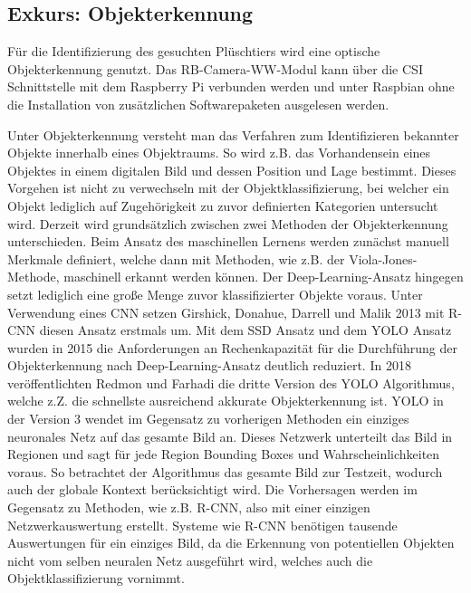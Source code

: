 \subsection{Exkurs: Objekterkennung}

Für die Identifizierung des gesuchten Plüschtiers wird eine optische Objekterkennung genutzt.
Das RB-Camera-WW-Modul kann über die \ac{CSI} Schnittstelle mit dem Raspberry Pi verbunden werden und unter Raspbian ohne die Installation von zusätzlichen Softwarepaketen ausgelesen werden.

Unter Objekterkennung versteht man das Verfahren zum Identifizieren bekannter Objekte innerhalb eines Objektraums. So wird z.B. das Vorhandensein eines Objektes in einem digitalen Bild und dessen Position und Lage bestimmt.
Dieses Vorgehen ist nicht zu verwechseln mit der Objektklassifizierung, bei welcher ein Objekt lediglich auf Zugehörigkeit zu zuvor definierten Kategorien untersucht wird.
Derzeit wird grundsätzlich zwischen zwei Methoden der Objekterkennung unterschieden.
Beim Ansatz des maschinellen Lernens werden zunächst manuell Merkmale definiert, welche dann mit Methoden, wie z.B. der Viola-Jones-Methode, maschinell erkannt werden können.
Der Deep-Learning-Ansatz hingegen setzt lediglich eine große Menge zuvor klassifizierter Objekte voraus.
Unter Verwendung eines \ac{CNN} setzen Girshick, Donahue, Darrell und Malik 2013 mit \ac{R-CNN} diesen Ansatz erstmals um.
Mit dem \ac{SSD} Ansatz und dem \ac{YOLO} Ansatz wurden in 2015 die Anforderungen an Rechenkapazität für die Durchführung der Objekterkennung nach Deep-Learning-Ansatz deutlich reduziert.
In 2018 veröffentlichten Redmon und Farhadi die dritte Version des \ac{YOLO} Algorithmus, welche z.Z. die schnellste ausreichend akkurate Objekterkennung ist.
\ac{YOLO} in der Version 3 wendet im Gegensatz zu vorherigen Methoden ein einziges neuronales Netz auf das gesamte Bild an. Dieses Netzwerk unterteilt das Bild in Regionen und sagt für jede Region Bounding Boxes und Wahrscheinlichkeiten voraus.
So betrachtet der Algorithmus das gesamte Bild zur Testzeit, wodurch auch der globale Kontext berücksichtigt wird.
Die Vorhersagen werden im Gegensatz zu Methoden, wie z.B. \ac{R-CNN}, also mit einer einzigen Netzwerkauswertung erstellt.
Systeme wie \ac{R-CNN} benötigen tausende Auswertungen für ein einziges Bild, da die Erkennung von potentiellen Objekten nicht vom selben neuralen Netz ausgeführt wird, welches auch die Objektklassifizierung vornimmt.

